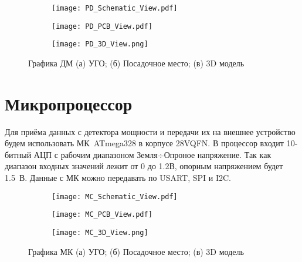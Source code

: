 \begin{figure}[H]
	\centering
	\begin{subfigure}[b]{0.45\textwidth}
		\centering
		\texttt{[image: PD\_Schematic\_View.pdf]}
		\caption{}%
		\label{fig:PD_Schematic_View}
	\end{subfigure}
	\hfill
	\begin{subfigure}[b]{0.45\textwidth}
		\centering
		\texttt{[image: PD\_PCB\_View.pdf]}
		\caption{}%
		\label{fig:PD_PCB_View}
	\end{subfigure}
	\hfill
	\begin{subfigure}[b]{0.5\textwidth}
		\centering
		\texttt{[image: PD\_3D\_View.png]}
		\caption{}%
		\label{fig:PD_3D_View}
	\end{subfigure}
	\caption{%
		Графика ДМ
		(а) УГО;
		(б) Посадочное место;
		(в) 3D модель
	}%
	\label{fig:PD_footprint}
\end{figure}

\section{Микропроцессор}

Для приёма данных с детектора мощности и передачи их на внешнее устройство будем использовать МК~ATmega328 в корпусе 28VQFN. В процессор входит 10-битный АЦП с рабочим диапазоном Земля$\div$Опроное напряжение. Так как диапазон входных значений лежит от 0 до 1.2В, опорным напряжением будет 1.5~В. Данные с МК можно передавать по USART, SPI и I2C.


\begin{figure}[H]
	\centering
	\begin{subfigure}[b]{0.6\textwidth}
		\centering
		\texttt{[image: MC\_Schematic\_View.pdf]}
		\caption{}%
		\label{fig:MC_Schematic_View}
	\end{subfigure}
	\hfill
	\begin{subfigure}[b]{0.27\textwidth}
		\centering
		\texttt{[image: MC\_PCB\_View.pdf]}
		\caption{}%
		\label{fig:MC_PCB_View}
	\end{subfigure}
	\hfill
	\begin{subfigure}[b]{0.6\textwidth}
		\centering
		\texttt{[image: MC\_3D\_View.png]}
		\caption{}%
		\label{fig:MC_3D_View}
	\end{subfigure}
	\caption{%
		Графика МК
		(а) УГО;
		(б) Посадочное место;
		(в) 3D модель
	}%
	\label{fig:MC_footprint}
\end{figure}

